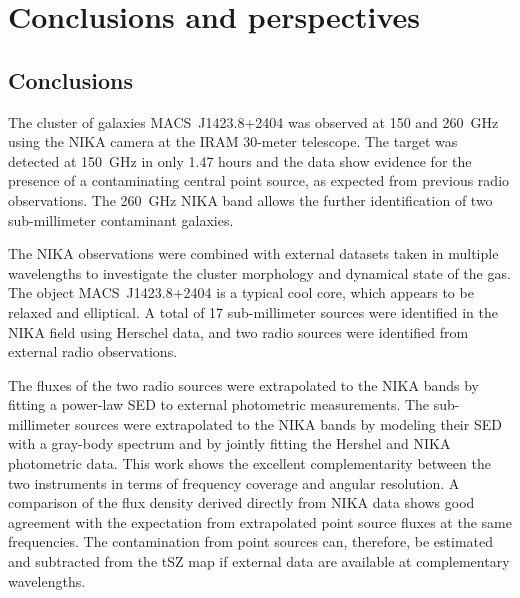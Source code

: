 \documentclass[traditabstract]{aa}
\begin{document}
\section{Conclusions and perspectives}\label{sec:conclusions}
\subsection{Conclusions}
The cluster of galaxies \mbox{MACS~J1423.8+2404} was observed at 150 and 260~GHz using the NIKA camera at the IRAM 30-meter telescope. The target was detected at 150~GHz in only 1.47 hours and the data show evidence for the presence of a contaminating central point source, as expected from previous radio observations. The 260~GHz NIKA band allows the further identification of two sub-millimeter contaminant galaxies.

The NIKA observations were combined with external datasets taken in multiple wavelengths to investigate the cluster morphology and  dynamical state of the gas. The object \mbox{MACS~J1423.8+2404} is a typical cool core, which appears to be relaxed and elliptical. A total of 17 sub-millimeter sources were identified in the NIKA field using Herschel data, and two radio sources were identified from external radio observations.

The fluxes of the two radio sources were extrapolated to the NIKA bands by fitting a power-law SED to external photometric measurements. The sub-millimeter sources were extrapolated to the NIKA bands by modeling their SED with a gray-body spectrum and by jointly fitting the Hershel and NIKA photometric data. This work shows the excellent complementarity between the two instruments in terms of frequency coverage and angular resolution. A comparison of the flux density derived directly from NIKA data  shows  good agreement with the expectation from extrapolated point source fluxes at the same frequencies. The contamination from point sources can, therefore, be estimated and subtracted from the tSZ map if external data are available at complementary wavelengths.
\end{document}
